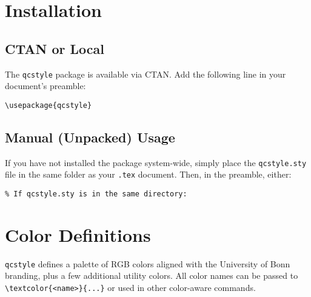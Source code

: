 \documentclass[a4paper,12pt]{article}
\begin{document}
\section{Installation}
\label{sec:installation}

\subsection{CTAN or Local }
 The \texttt{qcstyle} package is available via CTAN.
 Add the following line in your document’s preamble:
\begin{verbatim}
\usepackage{qcstyle}
\end{verbatim}

\subsection{Manual (Unpacked) Usage}
If you have not installed the package system-wide, simply place the \texttt{qcstyle.sty} file in the same folder as your \texttt{.tex} document. Then, in the preamble, either:
\begin{verbatim}
% If qcstyle.sty is in the same directory:

\end{verbatim}


\section{Color Definitions}
\label{sec:colors}
\texttt{qcstyle} defines a palette of RGB colors aligned with the University of Bonn branding, plus a few additional utility colors. All color names can be passed to \verb|\textcolor{<name>}{...}| or used in other color-aware commands.
\end{document}
